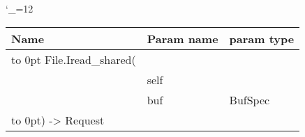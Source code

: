 \begingroup \catcode`\_=12 \tt
\begin{tabular}{lll}
\toprule
\textrm{Name}&\textrm{Param name}&\textrm{param type}\\
\midrule
\hbox to 0pt {File.Iread_shared(\hss}\\
& self\\
& buf & BufSpec\\
\hbox to 0pt{) -> Request\hss}\\
\bottomrule
\end{tabular}
\endgroup
